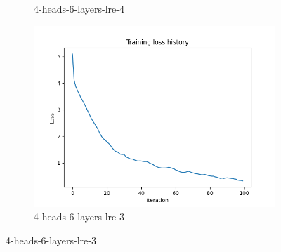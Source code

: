 \documentclass[11pt,addpoints,answers]{exam}
\begin{document}
\begin{questions}
\begin{figure}[H]
\begin{subfigure}[b]{0.32\linewidth}
        \caption{4-heads-6-layers-lre-4}
    \end{subfigure}
    \begin{subfigure}[b]{0.32\linewidth}
        \includegraphics[width=\linewidth]{case3_loss_out.png}
        \caption{4-heads-6-layers-lre-3}
    \end{subfigure}
    

\end{figure}
\end{questions}
\end{document}
